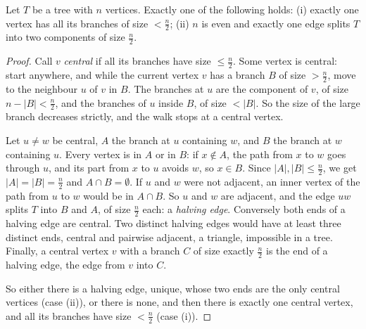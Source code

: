 \begin{lemma}[Jordan, 1869]\label{lem:centroid}
Let $T$ be a tree with $n$ vertices. Exactly one of the following holds: (i) exactly one vertex has all its branches of size
$<\frac n2$; (ii) $n$ is even and exactly one edge splits $T$ into two components of size $\frac n2$.
\end{lemma}
\begin{proof}
Call $v$ \emph{central} if all its branches have size $\le\frac n2$. Some vertex is central: start anywhere, and while the current vertex $v$ has a
branch $B$ of size $>\frac n2$, move to the neighbour $u$ of $v$ in $B$. The branches at $u$ are the component of $v$, of size $n-|B|<\frac n2$, and
the branches of $u$ inside $B$, of size $<|B|$. So the size of the large branch decreases strictly, and the walk stops at a central vertex.

Let $u\ne w$ be central, $A$ the branch at $u$ containing $w$, and $B$ the branch at $w$ containing $u$. Every vertex is in $A$ or in $B$:
if $x\notin A$, the path from $x$ to $w$ goes through $u$, and its part from $x$ to $u$ avoids $w$, so $x\in B$. Since $|A|,|B|\le\frac n2$, we get
$|A|=|B|=\frac n2$ and $A\cap B=\emptyset$. If $u$ and $w$ were not adjacent, an inner vertex of the path from $u$ to $w$ would be in $A\cap B$. So $u$ and $w$
are adjacent, and the edge $uw$ splits $T$ into $B$ and $A$, of size $\frac n2$ each: a \emph{halving edge}. Conversely both ends of a halving edge
are central. Two distinct halving edges would have at least three distinct ends, central and pairwise adjacent, a triangle,
impossible in a tree. Finally, a central vertex $v$ with a branch $C$ of size exactly $\frac n2$ is the end of a halving edge, the edge from
$v$ into $C$.

So either there is a halving edge, unique, whose two ends are the only central vertices (case (ii)), or there is none, and
then there is exactly one central vertex, and all its branches have size $<\frac n2$ (case (i)).
\end{proof}

